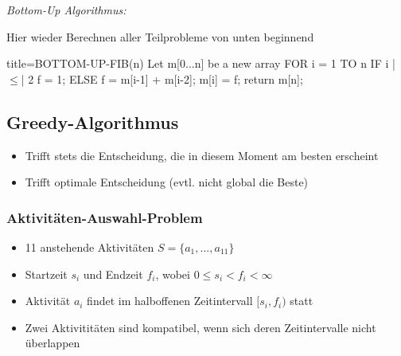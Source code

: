 \documentclass[
    ngerman,
    color=3b,
    load_common, %
    summary,
    boxarc,
]{rubos-tuda-template}
\begin{document}
\textit{Bottom-Up Algorithmus:}

Hier wieder Berechnen aller Teilprobleme von unten beginnend

                            \begin{codeBlock}[autogobble,escapeinside=||]{title={BOTTOM-UP-FIB(n)}}
                            Let m[0...n] be a new array
                            FOR i = 1 TO n
                                IF i |$\leq$| 2
                                    f = 1;
                                ELSE
                                    f = m[i-1] + m[i-2];
                                m[i] = f;
                            return m[n];
                            \end{codeBlock}


\clearpage
\subsection{Greedy-Algorithmus}
\begin{idea}\mbox{}
    \begin{itemize}
        \item Trifft stets die Entscheidung, die in diesem Moment am besten erscheint
        \item Trifft  optimale Entscheidung (evtl. nicht global die Beste)
    \end{itemize}
\end{idea}

\subsubsection{Aktivitäten-Auswahl-Problem}
\begin{definition}\mbox{}
    \begin{itemize}
        \item 11 anstehende Aktivitäten $S=\{a_1,...,a_{11}\}$
        \item Startzeit $s_i$ und Endzeit $f_i$, wobei $0 \leq s_i < f_i < \infty$
        \item Aktivität $a_i$ findet im halboffenen Zeitintervall $[s_i,f_i)$ statt
        \item Zwei Aktivititäten sind kompatibel, wenn sich deren Zeitintervalle nicht überlappen
    \end{itemize}
\end{definition}
\end{document}
